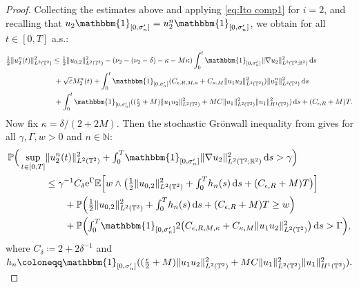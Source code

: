 \documentclass{amsart}
\newcommand{\dd}{\,\mathrm{d}}
\newcommand{\e}{\mathrm{e}}
\newcommand{\one}{\mathbbm{1}}
\newcommand{\<}{\langle}
\newcommand{\?}{\rangle}
\newcommand{\ceqq}{\coloneqq}
\newcommand{\Tor}{\mathbb{T}}
\renewcommand{\Tor}{\mathbb{T}^2}
\theoremstyle{plain}
\theoremstyle{remark}
\theoremstyle{plain}
\numberwithin{equation}{section}
\def\N{{\mathbb N}}
\def\R{{\mathbb R}}
\renewcommand{\P}{\mathbb{P}}
\newcommand{\eps}{\varepsilon}
\begin{document}
\begin{proof}
Collecting the   estimates above and applying \eqref{eq:Ito comp1} for $i=2$, and recalling that $u_2\one_{[0,\sigma_n']}=u_2^n\one_{[0,\sigma_n']}$, 
we obtain for all $t\in[0,T]$ a.s.: 
\begin{align}\label{eq:u2 est prep0}
  \tfrac12 \|u_2^n(t)\|_{L^2(\Tor)}^2  &\leq \tfrac12 \|u_{0,2}\|_{L^2(\Tor)}^2 -(\nu_2-(\nu_2-\delta)-\kappa-M\kappa)\int_0^t\one_{[0,\sigma_n']}\|\nabla u_2\|_{L^2(\Tor;\R^2)}^2\dd s\notag\\
   &\;+\sqrt{\eps}M_2^n(t)+ \int_0^t \one_{[0,\sigma_n']}(C_{\epsilon,{R},M,\kappa}+C_{\kappa,M}\|u_1u_2\|_{L^2(\Tor)}^2 ) \|u_2^n\|_{L^2(\Tor)}^2 \dd s\notag\\
   &\;+ \int_0^t\one_{[0,\sigma_n']}((\tfrac{\epsilon}{2}+M)\|u_1u_2\|_{L^2(\Tor)}^2+MC\|u_1\|_{L^2(\Tor)}^2\| u_1\|_{H^1(\Tor)}^2)\dd s+ (C_{\epsilon,R}+M)T.
\end{align}
Now fix $\kappa=\delta/(2+2M)$. 
Then the stochastic Gr\"onwall  inequality from \cite[Cor.\ 5.4b)]{geiss24}  gives for all $\gamma,\Gamma,w>0$ and $n\in\N$: 
\begin{align} \label{eq:u2 est prep} 
\begin{split}
    \P\Big(\sup_{t\in [0,T]} & \|u_2^n(t)\|_{L^2(\Tor)}^2+\textstyle{\int_0^T}\one_{[0,\sigma_n']}\|\nabla u_2\|_{L^2(\Tor;\R^2)}^2\dd s>\gamma\Big)  \\
   &\leq 
   \gamma^{-1}C_{\delta}\e^{\Gamma}\mathbb{E}\Big[w\wedge \big(\tfrac12\|u_{0,2}\|_{L^2(\Tor)}^2+\textstyle{\int_0^T}h_n(s)\dd s+(C_{\epsilon,R}+M)T\big)\Big] \\
   &\qquad +\P\Big(\tfrac12\|u_{0,2}\|_{L^2(\Tor)}^2+\textstyle{\int_0^T}h_n(s)\dd s+(C_{\epsilon,R}+M)T\geq w\Big) \\
   &\qquad +\P\Big(\textstyle{\int_0^T}\one_{[0,\sigma_n']}2\big(C_{\epsilon,{R},M,\kappa}+C_{\kappa,M}\|u_1u_2\|_{L^2(\Tor)}^2 \big) \dd s>\Gamma\Big), 
   \end{split}
\end{align} 
where $C_{\delta}\ceqq 2+ 2\delta^{-1}$ and   
$h_n\ceqq  \one_{[0,\sigma_n']}((\tfrac{\epsilon}{2}+M)\|u_1u_2\|_{L^2(\Tor)}^2+MC\|u_1\|_{L^2(\Tor)}^2\| u_1\|_{H^1(\Tor)}^2).$  


\end{proof}
\end{document}
